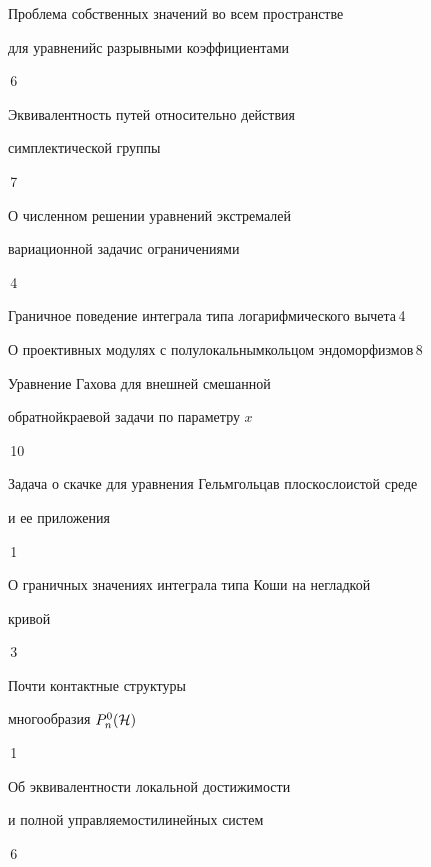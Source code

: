 

{Проблема собственных значений во всем пространстве


для уравнений\newline с разрывными коэффициентами}{\No\,6}




{Эквивалентность путей относительно действия


симплектической группы}{\No\,7}




{О численном решении уравнений экстремалей 


вариационной задачи\newline с ограничениями}{\No\,4}




{Граничное поведение интеграла типа логарифмического вычета}{\No\,4}




{О проективных модулях с полулокальным\newline кольцом эндоморфизмов}{\No\,8}




{Уравнение Гахова для внешней смешанной 


обратной\newline краевой задачи по параметру $x$}{\No\,10}






{Задача о скачке для уравнения Гельмгольца\newline в плоскослоистой среде


и ее приложения}{\No\,1}




{О граничных значениях интеграла типа Коши на негладкой\newline


кривой}{\No\,3}




{Почти контактные структуры


многообразия $P^0_n(\cal H)$}{\No\,1}




{Об эквивалентности локальной достижимости


и полной управляемости\newline линейных систем}{\No\,6}


